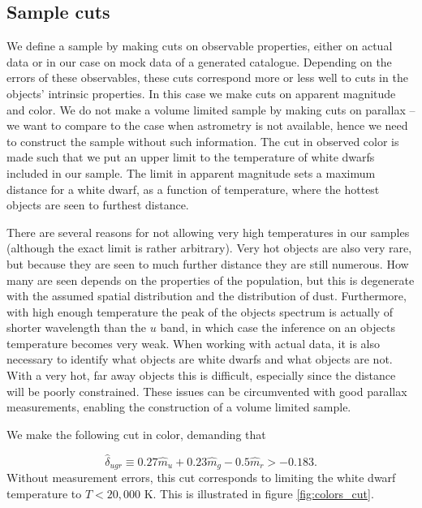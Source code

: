 \documentclass[fleqn,usenatbib]{mnras}
\newcommand{\Teff}{T}
\begin{document}
\subsection{Sample cuts}

We define a sample by making cuts on observable properties, either on actual data or in our case on mock data of a generated catalogue. Depending on the errors of these observables, these cuts correspond more or less well to cuts in the objects' intrinsic properties. In this case we make cuts on apparent magnitude and color. We do not make a volume limited sample by making cuts on parallax -- we want to compare to the case when astrometry is not available, hence we need to construct the sample without such information. The cut in observed color is made such that we put an upper limit to the temperature of white dwarfs included in our sample. The limit in apparent magnitude sets a maximum distance for a white dwarf, as a function of temperature, where the hottest objects are seen to furthest distance.

There are several reasons for not allowing very high temperatures in our samples (although the exact limit is rather arbitrary). Very hot objects are also very rare, but because they are seen to much further distance they are still numerous. How many are seen depends on the properties of the population, but this is degenerate with the assumed spatial distribution and the distribution of dust. Furthermore, with high enough temperature the peak of the objects spectrum is actually of shorter wavelength than the $u$ band, in which case the inference on an objects temperature becomes very weak. When working with actual data, it is also necessary to identify what objects are white dwarfs and what objects are not. With a very hot, far away objects this is difficult, especially since the distance will be poorly constrained. These issues can be circumvented with good parallax measurements, enabling the construction of a volume limited sample.

We make the following cut in color, demanding that

\begin{equation}
	\hat{\delta}_{ugr} \equiv 0.27\hat{m}_u+0.23\hat{m}_g-0.5\hat{m}_r>-0.183.
\end{equation}
Without measurement errors, this cut corresponds to limiting the white dwarf temperature to $\Teff<20,000$ K. This is illustrated in figure \ref{fig:colors_cut}.
\end{document}

